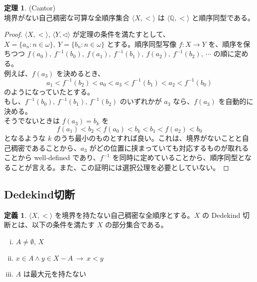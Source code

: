 \documentclass{jsarticle}
\theoremstyle{definition}
\newtheorem*{definition*}{定義}
\newtheorem{theorem}{定理}[section]
\begin{document}
    \begin{theorem} \label{Cantor_countable_total_order} (Cantor) \\
        境界がない自己稠密な可算な全順序集合 $\langle X, < \rangle$ は $\langle \mathbb{Q}, < \rangle$ と順序同型である。
    \end{theorem}
    \begin{proof}
        $\langle X, < \rangle, \, \langle Y, \lhd \rangle$ が定理の条件を満たすとして、$X = \{ a_n : n \in \omega \}, \ Y = \{ b_n : n \in \omega \}$ とする。順序同型写像 $f : X \rightarrow Y$ を、順序を保ちつつ $f(a_0), \ f^{-1}(b_0), \ f(a_1), \ f^{-1}(b_1), \ f(a_2), \ f^{-1}(b_2), \ \cdots$ の順に定める。\\
        例えば、$f(a_3)$ を決めるとき、
        $$a_1 < f^{-1}(b_2) < a_0 < a_3 < f^{-1}(b_1) < a_2 < f^{-1}(b_0)$$
        のようになっていたとする。\\
        もし、$f^{-1}(b_0), \, f^{-1}(b_1), \, f^{-1}(b_2)$ のいずれかが $a_3$ なら、$f(a_3)$ を自動的に決める。\\
        そうでないときは $f(a_3) = b_k$ を
        $$f(a_1) < b_2 < f(a_0) < b_k < b_1 < f(a_2) < b_0$$
        となるような $k$ のうち最小のものとすれば良い。これは、境界がないことと自己稠密であることから、$a_3$ がどの位置に挟まっていても対応するものが取れることから well-defined であり、$f^{-1}$ を同時に定めていることから、順序同型となることが言える。また、この証明には選択公理を必要としていない。
    \end{proof}
    
    \subsection*{Dedekind切断}
    \begin{definition*}
        $\langle X, < \rangle$ を境界を持たない自己稠密な全順序とする。$X$ の Dedekind 切断とは、以下の条件を満たす $X$ の部分集合である。
        \begin{enumerate}[(i)]
            \item $A \neq \emptyset, \, X$
            \item $x \in A \land y \in X - A \ \rightarrow \ x < y$
            \item $A$ は最大元を持たない
        \end{enumerate}
    \end{definition*}
    
\end{document}
